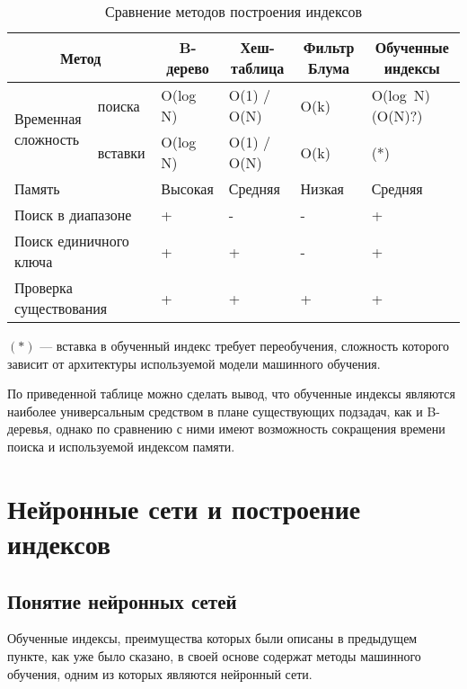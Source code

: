 {
\fontsize{12pt}{12pt}\selectfont
\captionsetup{format=hang,justification=raggedleft,
              singlelinecheck=off,width=17cm}
\begin{longtable}[Hc]{|p{2cm}|p{2cm}|p{2cm}|p{2cm}|p{2cm}|p{2cm}|}
\caption{Сравнение методов построения индексов\label{tab:01}}\\
    \hline
    \multicolumn{2}{|c|}{\textbf{Метод}} &
    \multicolumn{1}{c|}{\textbf{B-дерево}} &
    \multicolumn{1}{c|}{\textbf{Хеш-таблица}} &
    \multicolumn{1}{c|}{\parbox{2cm}{\centering\textbf{Фильтр Блума}}} &
    \multicolumn{1}{c|}{\parbox{2cm}{\centering\textbf{Обученные индексы}}}\\
    \hline
    \multirow{2}{*}{\parbox{2cm}{Временная\\сложность}} &
    поиска & O(log N) & O(1) / O(N) & O(k) & O(log~N) (O(N)?)\\
    \cline{2-6}
    & вставки & O(log N) & O(1) / O(N) & O(k) & (*)\\
    \hline
    \multicolumn{2}{|l|}{Память} & Высокая & Средняя & Низкая & Средняя\\
    \hline
    \multicolumn{2}{|l|}{Поиск в диапазоне} & + & - & - & + \\
    \hline
    \multicolumn{2}{|l|}{Поиск единичного ключа} & + & + & - & + \\
    \hline
    \multicolumn{2}{|l|}{Проверка существования} & + & + & + & + \\
    \hline
\end{longtable}
}

$(*)$ --- вставка в обученный индекс требует переобучения, сложность которого
зависит от архитектуры используемой модели машинного обучения.

По приведенной таблице можно сделать вывод, что обученные индексы являются
наиболее универсальным средством в плане существующих подзадач, как и B-деревья,
однако по сравнению с ними имеют возможность сокращения времени поиска и
используемой индексом памяти.

\section{Нейронные сети и построение индексов\label{classification}}

\subsection{Понятие нейронных сетей}

Обученные индексы, преимущества которых были описаны в предыдущем пункте, как
уже было сказано, в своей основе содержат методы машинного обучения, одним из
которых являются нейронный сети.


